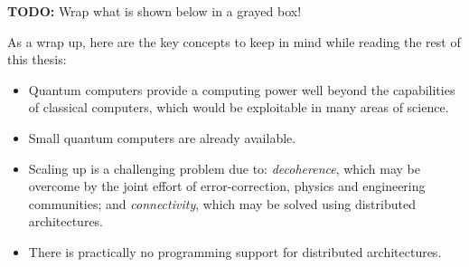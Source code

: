\textbf{TODO:} Wrap what is shown below in a grayed box!

As a wrap up, here are the key concepts to keep in mind while reading the rest of this thesis:

\begin{itemize}
  \item Quantum computers provide a computing power well beyond the capabilities of classical computers, which would be exploitable in many areas of science.
  \item Small quantum computers are already available. 
  \item Scaling up is a challenging problem due to: \textit{decoherence}, which may be overcome by the joint effort of error-correction, physics and engineering communities; and \textit{connectivity}, which may be solved using distributed architectures.
  \item There is practically no programming support for distributed architectures.
\end{itemize}
